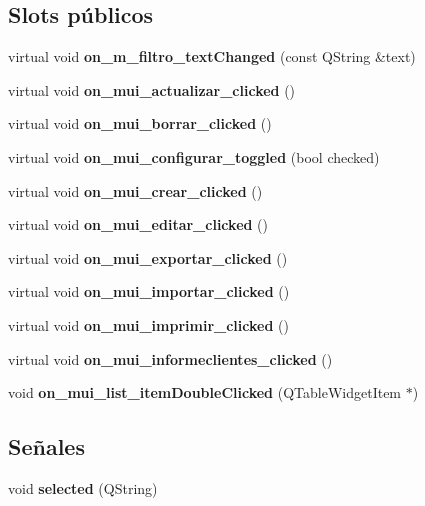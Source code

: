 \subsection*{Slots p\'{u}blicos}
\begin{CompactItemize}
\item 
virtual void {\bf on\_\-m\_\-filtro\_\-text\-Changed} (const QString \&text)\label{classClientsList_i0}

\item 
virtual void {\bf on\_\-mui\_\-actualizar\_\-clicked} ()\label{classClientsList_i1}

\item 
virtual void {\bf on\_\-mui\_\-borrar\_\-clicked} ()\label{classClientsList_i2}

\item 
virtual void {\bf on\_\-mui\_\-configurar\_\-toggled} (bool checked)\label{classClientsList_i3}

\item 
virtual void {\bf on\_\-mui\_\-crear\_\-clicked} ()\label{classClientsList_i4}

\item 
virtual void {\bf on\_\-mui\_\-editar\_\-clicked} ()\label{classClientsList_i5}

\item 
virtual void {\bf on\_\-mui\_\-exportar\_\-clicked} ()\label{classClientsList_i6}

\item 
virtual void {\bf on\_\-mui\_\-importar\_\-clicked} ()\label{classClientsList_i7}

\item 
virtual void {\bf on\_\-mui\_\-imprimir\_\-clicked} ()\label{classClientsList_i8}

\item 
virtual void {\bf on\_\-mui\_\-informeclientes\_\-clicked} ()\label{classClientsList_i9}

\item 
void {\bf on\_\-mui\_\-list\_\-item\-Double\-Clicked} (QTable\-Widget\-Item $\ast$)\label{classClientsList_i10}

\end{CompactItemize}
\subsection*{Se\~{n}ales}
\begin{CompactItemize}
\item 
void {\bf selected} (QString)\label{classClientsList_l0}

\end{CompactItemize}
